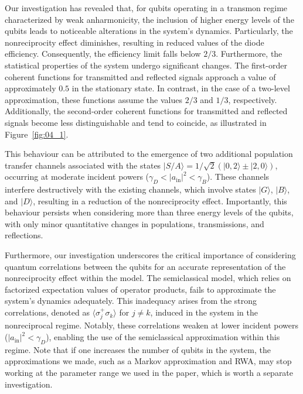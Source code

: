 \documentclass[lettersize,journal]{IEEEtran}
\begin{document}
Our investigation has revealed that, for qubits operating in a transmon regime characterized by weak anharmonicity, the inclusion of higher energy levels of the qubits leads to noticeable alterations in the system's dynamics. 
Particularly, the nonreciprocity effect diminishes, resulting in reduced values of the diode efficiency. 
Consequently, the efficiency limit falls below $2/3$. 
Furthermore, the statistical properties of the system undergo significant changes. 
The first-order coherent functions for transmitted and reflected signals approach a value of approximately $0.5$ in the stationary state. 
In contrast, in the case of a two-level approximation, these functions assume the values $2/3$ and $1/3$, respectively. 
Additionally, the second-order coherent functions for transmitted and reflected signals become less distinguishable and tend to coincide, as illustrated in Figure~\ref{fig:04_1}.

This behaviour can be attributed to the emergence of two additional population transfer channels associated with the states $|S/A\rangle = 1/\sqrt{2} \left( |0,2\rangle \pm |2,0\rangle \right)$, occurring at moderate incident powers ($\gamma_D < |a_\mathrm{in}|^2 < \gamma_B$). 
These channels interfere destructively with the existing channels, which involve states $|G\rangle$, $|B\rangle$, and $|D\rangle$, resulting in a reduction of the nonreciprocity effect. 
Importantly, this behaviour persists when considering more than three energy levels of the qubits, with only minor quantitative changes in populations, transmissions, and reflections.

Furthermore, our investigation underscores the critical importance of considering quantum correlations between the qubits for an accurate representation of the nonreciprocity effect within the model. 
The semiclassical model, which relies on factorized expectation values of operator products, fails to approximate the system's dynamics adequately. 
This inadequacy arises from the strong correlations, denoted as $\langle \sigma_j^+ \sigma_k \rangle$ for $j\neq k$, induced in the system in the nonreciprocal regime. 
Notably, these correlations weaken at lower incident powers ($|a_\mathrm{in}|^2 < \gamma_D$), enabling the use of the semiclassical approximation within this regime.
Note that if one increases the number of qubits in the system, the approximations we made, such as a Markov approximation and RWA, may stop working at the parameter range we used in the paper, which is worth a separate investigation.
\end{document}
